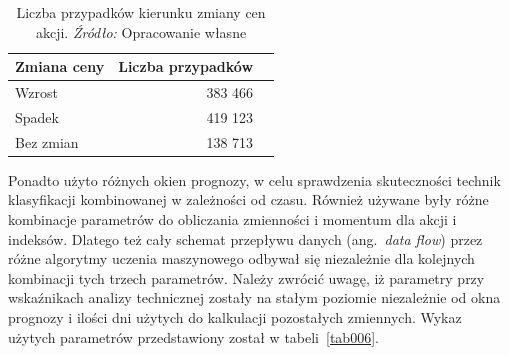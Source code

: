 \documentclass[12pt,a4paper,twoside,openany]{book}
\begin{document}
\begin{table}[ht] 
\caption{Liczba przypadków kierunku zmiany cen akcji. \textit{Źródło:} Opracowanie własne}\label{tab005}
\centering
\begin{tabular}{lrr}
  \hline
Zmiana ceny & Liczba przypadków \\
  \hline
Wzrost & 383 466\\
Spadek & 419 123\\
Bez zmian & 138 713\\
  \hline
\end{tabular}
\end{table}

Ponadto użyto różnych okien prognozy, w celu sprawdzenia skuteczności technik klasyfikacji kombinowanej w zależności od czasu. Również używane były różne kombinacje parametrów do obliczania zmienności i momentum dla akcji i indeksów. Dlatego też cały schemat przepływu danych (ang.~\textit{data flow}) przez różne algorytmy uczenia maszynowego odbywał się niezależnie dla kolejnych kombinacji tych trzech parametrów. Należy zwrócić uwagę, iż parametry przy wskaźnikach analizy technicznej zostały na stałym poziomie niezależnie od okna prognozy i ilości dni użytych do kalkulacji pozostałych zmiennych. Wykaz użytych parametrów przedstawiony został w tabeli~\ref{tab006}.
\end{document}
